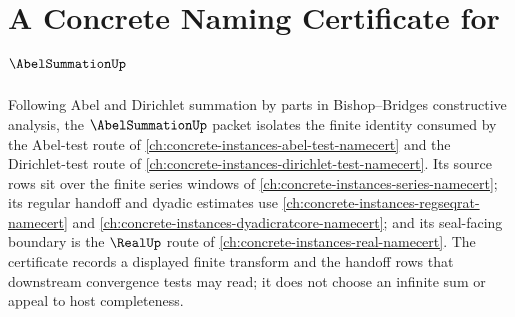 \chapter{A Concrete Naming Certificate for $\AbelSummationUp$}
\label{ch:concrete-instances-abel-summation-namecert}

Following Abel and Dirichlet summation by parts in Bishop--Bridges constructive analysis, the $\AbelSummationUp$ packet isolates the finite identity consumed by the Abel-test route of \autoref{ch:concrete-instances-abel-test-namecert} and the Dirichlet-test route of \autoref{ch:concrete-instances-dirichlet-test-namecert}. Its source rows sit over the finite series windows of \autoref{ch:concrete-instances-series-namecert}; its regular handoff and dyadic estimates use \autoref{ch:concrete-instances-regseqrat-namecert} and \autoref{ch:concrete-instances-dyadicratcore-namecert}; and its seal-facing boundary is the $\RealUp$ route of \autoref{ch:concrete-instances-real-namecert}. The certificate records a displayed finite transform and the handoff rows that downstream convergence tests may read; it does not choose an infinite sum or appeal to host completeness.

